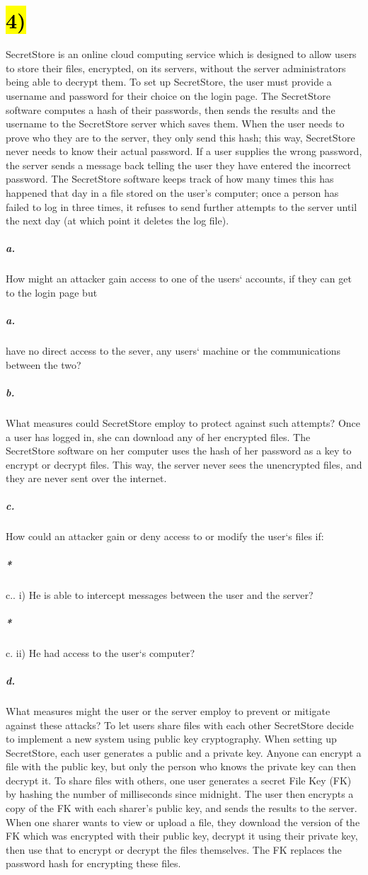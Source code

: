 \documentclass[11pt]{article}
\newcommand{\pnewline}[1]{\vspace*{-\baselineskip}\subparagraph*{{\color{white} #1}}}
\newcommand{\skipnewline}{\vspace*{-\baselineskip}}
\newcommand{\newnew}{\newline\newline}
\begin{document}
{\section*{\hl{4)}} SecretStore is an online cloud computing service which is designed to allow users to store their files, encrypted, on its servers, without the server administrators being able to decrypt them. \newnew
To set up SecretStore, the user must provide a username and password for their choice on the login page. The SecretStore software computes a hash of their passwords, then sends the results and the username to the SecretStore server which saves them. When the user needs to prove who they are to the server, they only send this hash; this way, SecretStore never needs to know their actual password.\newnew
If a user supplies the wrong password, the server sends a message back telling the user they have entered the incorrect password. The SecretStore software keeps track of how many times this has happened that day in a file stored on the user's computer; once a person has failed to log in three times, it refuses to send further attempts to the server until the next day (at which point it deletes the log file).
\subparagraph*{a.} How might an attacker gain access to one of the users` accounts, if they can get to the login page but \pnewline{a.}have no direct access to the sever, any users` machine or the communications between the two?\skipnewline
\subparagraph*{b.} What measures could SecretStore employ to protect against such attempts?\newnew
Once a user has logged in, she can download any of her encrypted files. The SecretStore software on her computer uses the hash of her password as a key to encrypt or decrypt files. This way, the server never sees the unencrypted files, and they are never sent over the internet.
\subparagraph*{c.} How could an attacker gain or deny access to or modify the user`s files if:\newline
\pnewline*{\color{white} c..} i) He is able to intercept messages between the user and the server?
\pnewline*{\color{white} c.} ii) He had access to the user`s computer?
\subparagraph*{d.} What measures might the user or the server employ to prevent or mitigate against these attacks? \newnew
To let users share files with each other SecretStore decide to implement a new system using public key cryptography. When setting up SecretStore, each user generates a public and a private key. Anyone can encrypt a file with the public key, but only the person who knows the private key can then decrypt it.\newnew
To share files with others, one user generates a secret File Key (FK) by hashing the number of milliseconds since midnight. The user then encrypts a copy of the FK with each sharer's public key, and sends the results to the server. When one sharer wants to view or upload a file, they download the version of the FK which was encrypted with their public key, decrypt it using their private key, then use that to encrypt or decrypt the files themselves. The FK replaces the password hash for encrypting these files. 
}
\end{document}
